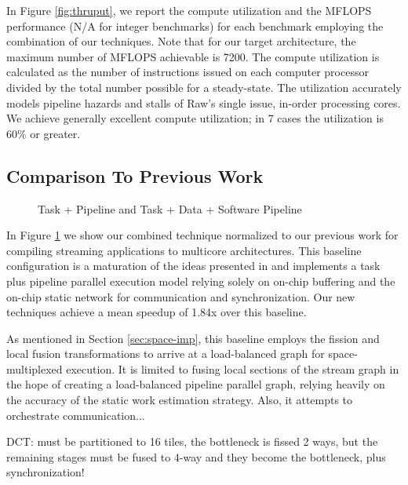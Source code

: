 In Figure \ref{fig:thruput}, we report the compute utilization and the
MFLOPS performance (N/A for integer benchmarks) for each benchmark
employing the combination of our techniques. Note that for our target
architecture, the maximum number of MFLOPS achievable is 7200.  The
compute utilization is calculated as the number of instructions issued
on each computer processor divided by the total number possible for a
steady-state.  The utilization accurately models pipeline hazards and
stalls of Raw's single issue, in-order processing cores.  We achieve
generally excellent compute utilization; in 7 cases the utilization is
60\% or greater.


\subsection{Comparison To Previous Work}

\begin{figure}[t]
\centering
{}
\caption{Task + Pipeline and Task + Data + Software Pipeline
\protect\label{fig:vs-space}}
\end{figure}

\begin{figure*}[t]
\centering
{}
\caption{Comparison and Task + Data + Software Pipeline Performance Results
\protect\label{fig:thruput}}
\end{figure*}
In Figure \ref{fig:vs-space} we show our combined technique normalized
to our previous work for compiling streaming applications to multicore
architectures.  This baseline configuration is a maturation of the
ideas presented in \cite{streamit-asplos} and implements a task plus
pipeline parallel execution model relying solely on on-chip buffering
and the on-chip static network for communication and
synchronization. Our new techniques achieve a mean speedup of 1.84x
over this baseline.  

As mentioned in Section \ref{sec:space-imp}, this baseline employs the
fission and local fusion transformations to arrive at a load-balanced
graph for space-multiplexed execution.  It is limited to fusing local
sections of the stream graph in the hope of creating a load-balanced
pipeline parallel graph, relying heavily on the accuracy of the static
work estimation strategy.  Also, it attempts to orchestrate
communication...
 
DCT: must be partitioned to 16 tiles, the bottleneck is fissed 2 ways,
but the remaining stages must be fused to 4-way and they become the
bottleneck, plus synchronization!

